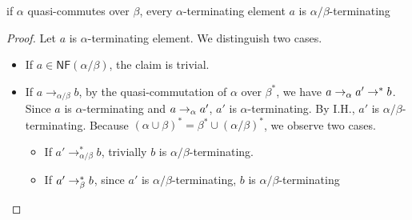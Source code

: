 \documentclass[12pt,aspectratio=169]{beamer}
\begin{document}
\newcommand{\abto}{\to_{\alpha/\beta}}

\begin{frame}
    \frametitle{}
    \begin{lemma}
        if $\alpha$ quasi-commutes over $\beta$,
        every $\alpha$-terminating element $a$ is $\alpha/\beta$-terminating
    \end{lemma}

    \begin{proof}
        Let $a$ is $\alpha$-terminating element.
        We distinguish two cases.
        \begin{itemize}
            \item If $a \in \mathsf{NF}(\alpha/\beta)$, the claim is trivial.
            \item If $a \abto b$, by the quasi-commutation of $\alpha$ over $\beta^*$, we have
            $a \to_{\alpha} a' \to^* b$. Since $a$ is $\alpha$-terminating and $a \to_{\alpha} a'$,
            $a'$ is $\alpha$-terminating. By I.H., $a'$ is $\alpha/\beta$-terminating.
            Because $(\alpha \cup \beta)^* = \beta^* \cup (\alpha/\beta)^*$,
            we observe two cases.
            \begin{itemize}
                \item If $a' \abto^* b$, trivially $b$ is $\alpha/\beta$-terminating.
                \item If $a' \to_{\beta}^* b$, since $a'$ is $\alpha/\beta$-terminating, $b$ is $\alpha/\beta$-terminating 
            \end{itemize}
        \end{itemize}

    \end{proof}

\end{frame}
\end{document}
